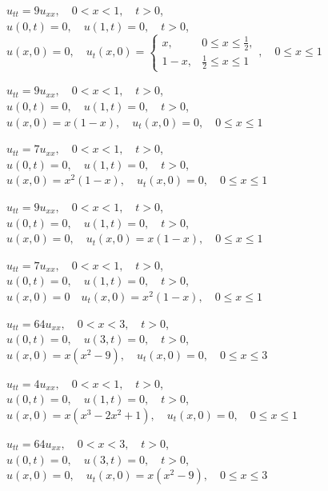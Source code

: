 \begin{exerciselist}
  \item\label{exer:12.2.1} $u_{tt}=9u_{xx},\quad0<x<1,\quad t>0$,\\ $u(0,t)=0,\quad u(1,t)=0,\quad t>0$,\\ $u(x,0)=0,\quad u_{t}(x,0)= \left\{
  \begin{array}{cl}
    x,   & 0\le x\le\frac{1}{2}, \\
    1-x, & \frac{1}{2}\le x\le1
  \end{array}\right.,\quad0\le x\le1$

  \item\label{exer:12.2.2} $u_{tt}=9u_{xx},\quad0<x<1,\quad t>0$,\\ $u(0,t)=0,\quad u(1,t)=0,\quad t>0$,\\ $u(x,0)=x(1-x),\quad u_{t}(x,0)=0,\quad0\le x\le1$

  \item\label{exer:12.2.3} $u_{tt}=7u_{xx},\quad0<x<1,\quad t>0$,\\ $u(0,t)=0,\quad u(1,t)=0,\quad t>0$,\\ $u(x,0)=x^{2}(1-x),\quad u_{t}(x,0)=0,\quad0\le x\le1$

  \item\label{exer:12.2.4} \Cex $u_{tt}=9u_{xx},\quad0<x<1,\quad t>0$,\\ $u(0,t)=0,\quad u(1,t)=0,\quad t>0$,\\ $u(x,0)=0,\quad u_{t}(x,0)=x(1-x),\quad0\le x\le1$

  \item\label{exer:12.2.5} $u_{tt}=7u_{xx},\quad0<x<1,\quad t>0$,\\ $u(0,t)=0,\quad u(1,t)=0,\quad t>0$,\\ $u(x,0)=0\quad u_{t}(x,0)=x^{2}(1-x),\quad0\le x\le1$

  \item\label{exer:12.2.6} $u_{tt}=64u_{xx},\quad0<x<3,\quad t>0$,\\ $u(0,t)=0,\quad u(3,t)=0,\quad t>0$,\\ $u(x,0)=x(x^{2}-9),\quad u_{t}(x,0)=0,\quad0\le x\le3$

  \item\label{exer:12.2.7} $u_{tt}=4u_{xx},\quad0<x<1,\quad t>0$,\\ $u(0,t)=0,\quad u(1,t)=0,\quad t>0$,\\ $u(x,0)=x(x^{3}-2x^{2}+1),\quad u_{t}(x,0)=0,\quad0\le x\le1$

  \item\label{exer:12.2.8} \Cex $u_{tt}=64u_{xx},\quad0<x<3,\quad t>0$,\\ $u(0,t)=0,\quad u(3,t)=0,\quad t>0$,\\ $u(x,0)=0,\quad u_{t}(x,0)=x(x^{2}-9),\quad0\le x\le3$


\end{exerciselist}
